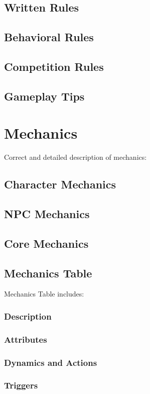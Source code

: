     \subsection{Written Rules}
    \subsection{Behavioral Rules}
    \subsection{Competition Rules}
    \subsection{Gameplay Tips}

\section{Mechanics}
Correct and detailed description of mechanics:
    \subsection{Character Mechanics}
    \subsection{NPC Mechanics}
    \subsection{Core Mechanics}
    \subsection{Mechanics Table}
    Mechanics Table includes:
        \subsubsection{Description}
        \subsubsection{Attributes}
        \subsubsection{Dynamics and Actions}
        \subsubsection{Triggers}
